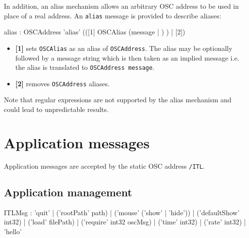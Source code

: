 \documentclass[a4paper,twoside]{report}
\newcommand{\toplevel}[1]	{\chapter{#1}}
\newcommand{\sublevel}[1]	{\section{#1}}
\newcommand{\OSC}[1]		{\texttt{#1}}
\begin{document}
In addition, an alias mechanism allows an arbitrary OSC address to be used in place of a real address. An \OSC{alias} message is provided to describe aliases: 
\begin{rail}
alias : OSCAddress 'alias' (([1] OSCAlias (message | ) ) | [2])
\end{rail}
\begin{itemize}
\item \textbf{[1]} sets \OSC{OSCAlias} as an alias of \OSC{OSCAddress}. The alias may be optionally followed by a message string which is then taken as an implied message i.e. the alias is translated to \OSC{OSCAddress message}.
\item \textbf{[2]} removes \OSC{OSCAddress} aliases.
\end{itemize}

Note that regular expressions are not supported by the alias mechanism and could lead to unpredictable results.


\toplevel{Application messages}
\label{ITL}
Application messages are accepted by the static OSC address \OSC{/ITL}. 


\sublevel{Application management}

\begin{rail}
ITLMsg : 'quit' 
		| ('rootPath' path) 
		| ('mouse' ('show' | 'hide'))
		| ('defaultShow' int32)
		| ('load' filePath)
		| ('require' int32 oscMsg)
		| ('time' int32)
		| ('rate' int32)
		| 'hello'
\end{rail}
\end{document}
